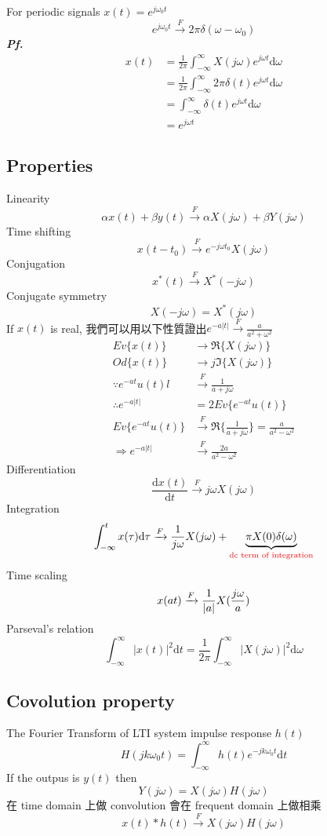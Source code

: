 \documentclass[12pt, a4paper]{article}
\begin{document}
For periodic signals $x(t) = e^{j\omega_0 t}$
$$
e^{j\omega_0 t} \xrightarrow{F} 2\pi \delta(\omega - \omega_0)
$$
\textbf{\textit{Pf.}}
\begin{align*}
	x(t) &= \frac{1}{2\pi} \int_{-\infty}^{\infty} X(j\omega) e^{j\omega t}\text{d}\omega \\
			 &= \frac{1}{2\pi} \int_{-\infty}^{\infty} 2\pi \delta(t) e^{j\omega t} \text{d} \omega \\
			 &= \int_{-\infty}^{\infty} \delta(t) e^{j\omega t}\text{d} \omega \\
			 &= e^{j\omega t}
\end{align*}
\newpage
\subsection*{Properties}
Linearity
$$
\alpha x(t) + \beta y(t) \xrightarrow{F} \alpha X(j\omega) + \beta Y(j\omega)
$$
Time shifting
$$
x(t-t_0) \xrightarrow{F} e^{-j\omega t_0}X(j\omega)
$$
Conjugation
$$
x^*(t) \xrightarrow{F} X^*(-j\omega)
$$
Conjugate symmetry
$$
X(-j\omega) = X^*(j\omega)
$$
If $x(t)$ is real, 我們可以用以下性質證出$e^{-a\left|t\right|} \xrightarrow{F} \frac{a}{a^2+\omega^2}$
\begin{align*}
	Ev \{x(t)\} &\longrightarrow \Re \{X(j\omega)\} \\
	Od \{x(t)\} &\longrightarrow j\Im \{X(j\omega)\} \\
	\because e^{-at}u(t)l &\xrightarrow{F} \frac{1}{a+j\omega} \\
	\therefore e^{-a\left|t\right|} &= 2Ev \{e^{-at}u(t)\} \\
	Ev \{e^{-at}u(t)\}&\xrightarrow{F} \Re \{\frac{1}{a+j\omega}\} = \frac{a}{a^2 - \omega^2} \\
	\Rightarrow e^{-a\left|t\right|} &\xrightarrow{F} \frac{2a}{a^2 - \omega^2}
\end{align*}
Differentiation
$$
\frac{\text{d}x(t)}{\text{d}t} \xrightarrow{F} j\omega X(j\omega)
$$
Integration
$$
\int_{-\infty}^{t} x(\tau)\text{d}\tau \xrightarrow{F} \frac{1}{j\omega}X(j\omega) + \underbrace {\pi X(0) \delta(\omega)}_{\text{\color{red} dc term of integration}}
$$
Time scaling
$$
x(at) \xrightarrow{F} \frac{1}{\left|a\right|}X(\frac{j\omega}{a}) \\
$$
Parseval's relation
$$
\int_{-\infty}^{\infty} \left|x(t)\right|^2 \text{d}t = \frac{1}{2\pi} \int_{-\infty}^{\infty} \left|X(j\omega)\right|^2 \text{d} \omega
$$
\newpage

\subsection*{Covolution property}
The Fourier Transform of LTI system impulse response $h(t)$
$$
H(jk\omega_0 t) = \int_{-\infty}^{\infty} h(t) e^{-jk\omega_0t} \text{d}t
$$
If the outpus is $y(t)$ then
$$
Y(j\omega) = X(j\omega)H(j\omega)
$$
在 time domain 上做 convolution 會在 frequent domain 上做相乘
$$
x(t)*h(t) \xrightarrow{F} X(j\omega)H(j\omega)
$$
\end{document}
